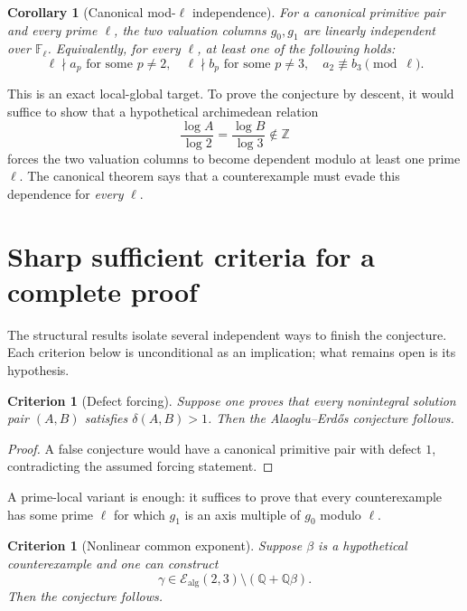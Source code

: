 \documentclass[11pt]{article}
\numberwithin{equation}{section}
\newtheorem{corollary}[theorem]{Corollary}
\newtheorem{criterion}[theorem]{Criterion}
\theoremstyle{definition}
\newcommand{\Q}{\mathbb{Q}}
\newcommand{\Z}{\mathbb{Z}}
\newcommand{\defect}{\delta}
\newcommand{\Ealg}{\mathcal E_{\mathrm{alg}}}
\begin{document}
\begin{corollary}[Canonical mod-\(\ell\) independence]\label{cor:modlind}
For a canonical primitive pair and every prime \(\ell\), the two valuation columns \(g_0,g_1\) are linearly independent over \(\mathbb F_\ell\). Equivalently, for every \(\ell\), at least one of the following holds:
\[
 \ell\nmid a_p\text{ for some }p\ne2,
 \quad
 \ell\nmid b_p\text{ for some }p\ne3,
 \quad
 a_2\not\equiv b_3\pmod\ell.
\]
\end{corollary}

This is an exact local-global target. To prove the conjecture by descent, it would suffice to show that a hypothetical archimedean relation
\[
       \frac{\log A}{\log2}=\frac{\log B}{\log3}\notin\Z
\]
forces the two valuation columns to become dependent modulo at least one prime \(\ell\). The canonical theorem says that a counterexample must evade this dependence for \emph{every} \(\ell\).

\section{Sharp sufficient criteria for a complete proof}

The structural results isolate several independent ways to finish the conjecture. Each criterion below is unconditional as an implication; what remains open is its hypothesis.

\begin{criterion}[Defect forcing]\label{crit:defect}
Suppose one proves that every nonintegral solution pair \((A,B)\) satisfies \(\defect(A,B)>1\). Then the Alaoglu--Erd\H{o}s conjecture follows.
\end{criterion}

\begin{proof}
A false conjecture would have a canonical primitive pair with defect \(1\), contradicting the assumed forcing statement.
\end{proof}

A prime-local variant is enough: it suffices to prove that every counterexample has some prime \(\ell\) for which \(g_1\) is an axis multiple of \(g_0\) modulo \(\ell\).

\begin{criterion}[Nonlinear common exponent]\label{crit:nonlinear}
Suppose \(\beta\) is a hypothetical counterexample and one can construct
\[
       \gamma\in\Ealg(2,3)\setminus(\Q+\Q\beta).
\]
Then the conjecture follows.
\end{criterion}
\end{document}
